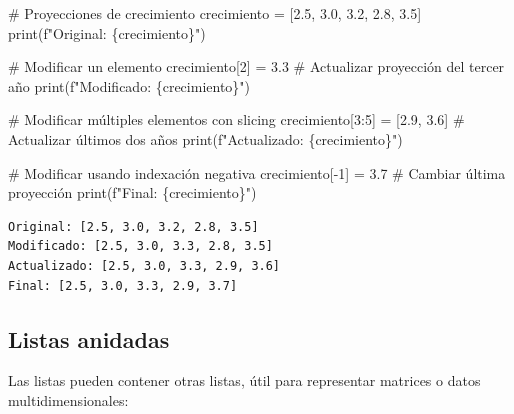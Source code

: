 \documentclass[
  doc,
  floatsintext,
  longtable,
  a4paper,
  nolmodern,
  notxfonts,
  notimes,
  12pt,
  colorlinks=true,linkcolor=blue,citecolor=blue,urlcolor=blue]{apa7}
\newenvironment{Shaded}{\begin{snugshade}}{\end{snugshade}}
\newcommand{\BuiltInTok}[1]{\textcolor[rgb]{0.00,0.23,0.31}{#1}}
\newcommand{\CommentTok}[1]{\textcolor[rgb]{0.37,0.37,0.37}{#1}}
\newcommand{\DecValTok}[1]{\textcolor[rgb]{0.68,0.00,0.00}{#1}}
\newcommand{\FloatTok}[1]{\textcolor[rgb]{0.68,0.00,0.00}{#1}}
\newcommand{\NormalTok}[1]{\textcolor[rgb]{0.00,0.23,0.31}{#1}}
\newcommand{\OperatorTok}[1]{\textcolor[rgb]{0.37,0.37,0.37}{#1}}
\newcommand{\SpecialCharTok}[1]{\textcolor[rgb]{0.37,0.37,0.37}{#1}}
\newcommand{\SpecialStringTok}[1]{\textcolor[rgb]{0.13,0.47,0.30}{#1}}
\begin{document}
\begin{Shaded}
\begin{Highlighting}[]
\CommentTok{\# Proyecciones de crecimiento}
\NormalTok{crecimiento }\OperatorTok{=}\NormalTok{ [}\FloatTok{2.5}\NormalTok{, }\FloatTok{3.0}\NormalTok{, }\FloatTok{3.2}\NormalTok{, }\FloatTok{2.8}\NormalTok{, }\FloatTok{3.5}\NormalTok{]}
\BuiltInTok{print}\NormalTok{(}\SpecialStringTok{f"Original: }\SpecialCharTok{\{}\NormalTok{crecimiento}\SpecialCharTok{\}}\SpecialStringTok{"}\NormalTok{)}

\CommentTok{\# Modificar un elemento}
\NormalTok{crecimiento[}\DecValTok{2}\NormalTok{] }\OperatorTok{=} \FloatTok{3.3}  \CommentTok{\# Actualizar proyección del tercer año}
\BuiltInTok{print}\NormalTok{(}\SpecialStringTok{f"Modificado: }\SpecialCharTok{\{}\NormalTok{crecimiento}\SpecialCharTok{\}}\SpecialStringTok{"}\NormalTok{)}

\CommentTok{\# Modificar múltiples elementos con slicing}
\NormalTok{crecimiento[}\DecValTok{3}\NormalTok{:}\DecValTok{5}\NormalTok{] }\OperatorTok{=}\NormalTok{ [}\FloatTok{2.9}\NormalTok{, }\FloatTok{3.6}\NormalTok{]  }\CommentTok{\# Actualizar últimos dos años}
\BuiltInTok{print}\NormalTok{(}\SpecialStringTok{f"Actualizado: }\SpecialCharTok{\{}\NormalTok{crecimiento}\SpecialCharTok{\}}\SpecialStringTok{"}\NormalTok{)}

\CommentTok{\# Modificar usando indexación negativa}
\NormalTok{crecimiento[}\OperatorTok{{-}}\DecValTok{1}\NormalTok{] }\OperatorTok{=} \FloatTok{3.7}  \CommentTok{\# Cambiar última proyección}
\BuiltInTok{print}\NormalTok{(}\SpecialStringTok{f"Final: }\SpecialCharTok{\{}\NormalTok{crecimiento}\SpecialCharTok{\}}\SpecialStringTok{"}\NormalTok{)}
\end{Highlighting}
\end{Shaded}

\begin{verbatim}
Original: [2.5, 3.0, 3.2, 2.8, 3.5]
Modificado: [2.5, 3.0, 3.3, 2.8, 3.5]
Actualizado: [2.5, 3.0, 3.3, 2.9, 3.6]
Final: [2.5, 3.0, 3.3, 2.9, 3.7]
\end{verbatim}

\subsection{Listas anidadas}\label{listas-anidadas}

Las listas pueden contener otras listas, útil para representar matrices
o datos multidimensionales:
\end{document}
